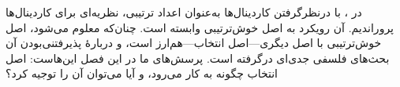 \documentclass[../../../include/open-logic-section]{subfiles}
\begin{document}


در ، با درنظرگرفتن
کاردینال‌ها به‌عنوان اعداد ترتیبی، نظریه‌ای برای کاردینال‌ها پروراندیم.
آن رویکرد به اصل خوش‌ترتیبی وابسته است. چنان‌که معلوم می‌شود، اصل
خوش‌ترتیبی با اصل دیگری---اصل انتخاب---هم‌ارز است، و دربارهٔ پذیرفتنی‌بودن
آن بحث‌های فلسفی جدی‌ای درگرفته است. پرسش‌های ما در این فصل این‌هاست:
اصل انتخاب چگونه به کار می‌رود، و آیا می‌توان آن را توجیه کرد؟
\end{document}
